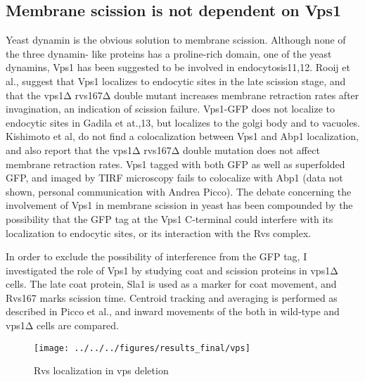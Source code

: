 	\subsection{Membrane scission is not dependent on Vps1}
	Yeast dynamin is the obvious solution to membrane scission. Although none of the three dynamin- like proteins has a proline-rich domain, one of the yeast dynamins, Vps1 has been suggested to be involved in endocytosis11,12. Rooij et al., suggest that Vps1 localizes to endocytic sites in the late scission stage, and that the vps1Δ rvs167Δ double mutant increases membrane retraction rates after invagination, an indication of scission failure. Vps1-GFP does not localize to endocytic sites in Gadila et at.,13, but localizes to the golgi body and to vacuoles. Kishimoto et al, do not find a colocalization between Vps1 and Abp1 localization, and also report that the vps1Δ rvs167Δ  double mutation does not affect membrane retraction rates. Vps1 tagged with both GFP as well as superfolded GFP, and imaged by TIRF microscopy fails to colocalize with Abp1 (data not shown, personal communication with Andrea Picco). The debate concerning the involvement of Vps1 in membrane scission in yeast has been compounded by the possibility that the GFP tag at the Vps1 C-terminal could interfere with its localization to endocytic sites, or its interaction with the Rvs complex. 
	
	\vspace{5mm}
	In order to exclude the possibility of interference from the GFP tag, I investigated the role of Vps1 by studying coat and scission proteins in vps1Δ cells. The late coat protein, Sla1 is used as a marker for coat movement, and Rvs167 marks scission time. Centroid tracking and averaging is performed as described in Picco et al., and inward movements of the both in wild-type and vps1Δ cells are compared. 

	\begin{figure}
	\centering
	\texttt{[image: ../../../figures/results\_final/vps]}
		\caption{Rvs localization in vps deletion\label{fig3_vpsdel}}
	\end{figure}

